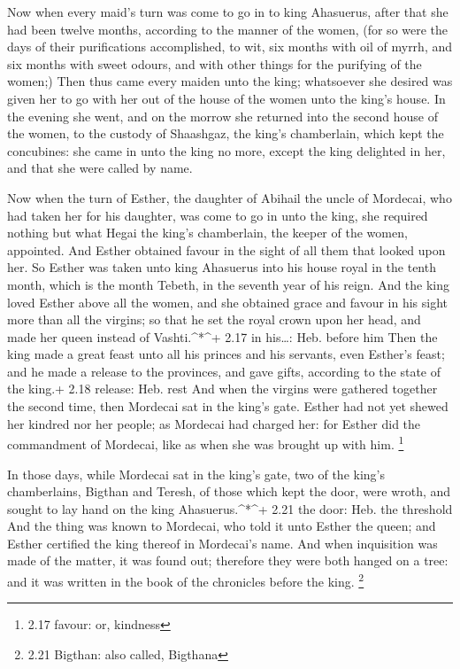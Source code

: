  Now when every maid's turn was come to go in to king
Ahasuerus, after that she had been twelve months, according to the
manner of the women, (for so were the days of their purifications
accomplished, to wit, six months with oil of myrrh, and six months with
sweet odours, and with other things for the purifying of the women;)
 Then thus came every maiden unto the king; whatsoever she
desired was given her to go with her out of the house of the women unto
the king's house.  In the evening she went, and on the
morrow she returned into the second house of the women, to the custody
of Shaashgaz, the king's chamberlain, which kept the concubines: she
came in unto the king no more, except the king delighted in her, and
that she were called by name.

 Now when the turn of Esther, the daughter of Abihail the
uncle of Mordecai, who had taken her for his daughter, was come to go in
unto the king, she required nothing but what Hegai the king's
chamberlain, the keeper of the women, appointed. And Esther obtained
favour in the sight of all them that looked upon her.  So
Esther was taken unto king Ahasuerus into his house royal in the tenth
month, which is the month Tebeth, in the seventh year of his reign.
 And the king loved Esther above all the women, and she
obtained grace and favour in his sight more than all the virgins; so
that he set the royal crown upon her head, and made her queen instead of
Vashti.\^{}*\^{}+ 2.17 in his\ldots: Heb. before him  Then
the king made a great feast unto all his princes and his servants, even
Esther's feast; and he made a release to the provinces, and gave gifts,
according to the state of the king.+ 2.18 release: Heb. rest
 And when the virgins were gathered together the second
time, then Mordecai sat in the king's gate.  Esther had not
yet shewed her kindred nor her people; as Mordecai had charged her: for
Esther did the commandment of Mordecai, like as when she was brought up
with him. \footnote{2.17 favour: or, kindness}

 In those days, while Mordecai sat in the king's gate, two
of the king's chamberlains, Bigthan and Teresh, of those which kept the
door, were wroth, and sought to lay hand on the king
Ahasuerus.\^{}*\^{}+ 2.21 the door: Heb. the threshold  And
the thing was known to Mordecai, who told it unto Esther the queen; and
Esther certified the king thereof in Mordecai's name.  And
when inquisition was made of the matter, it was found out; therefore
they were both hanged on a tree: and it was written in the book of the
chronicles before the king. \footnote{2.21 Bigthan: also called,
  Bigthana}

